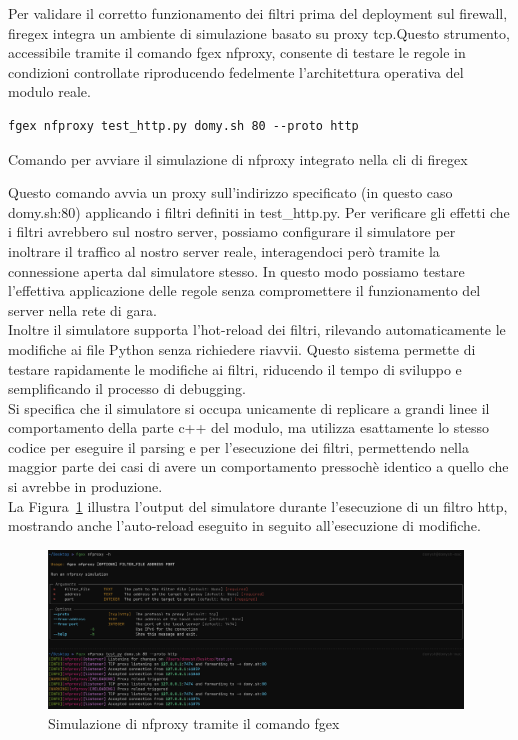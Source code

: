 Per validare il corretto funzionamento dei filtri prima del deployment sul firewall, firegex integra un ambiente di simulazione basato su proxy \gls{tcp}.\@ Questo strumento, accessibile tramite il comando fgex \gls{nfproxy}, consente di testare le regole in condizioni controllate riproducendo fedelmente l'architettura operativa del modulo reale.
\begin{listing}[H]
\begin{verbatim}
fgex nfproxy test_http.py domy.sh 80 --proto http
\end{verbatim}
\caption{Comando per avviare il simulazione di nfproxy integrato nella \gls{cli} di firegex}\label{lst:nfproxy_sim_cmd}
\end{listing}

Questo comando avvia un proxy sull'indirizzo specificato (in questo caso domy.sh:80) applicando i filtri definiti in test\_http.py.
Per verificare gli effetti che i filtri avrebbero sul nostro server, possiamo configurare il simulatore per inoltrare il traffico al nostro server reale, interagendoci però tramite la connessione aperta dal simulatore stesso. In questo modo possiamo testare l'effettiva applicazione delle regole senza compromettere il funzionamento del server nella rete di gara.  \\
Inoltre il simulatore supporta l'hot-reload dei filtri, rilevando automaticamente le modifiche ai file Python senza richiedere riavvii. Questo sistema permette di testare rapidamente le modifiche ai filtri, riducendo il tempo di sviluppo e semplificando il processo di debugging.\\
Si specifica che il simulatore si occupa unicamente di replicare a grandi linee il comportamento della parte c++ del modulo, ma utilizza esattamente lo stesso codice per eseguire il parsing e per l'esecuzione dei filtri, permettendo nella maggior parte dei casi di avere un comportamento pressochè identico a quello che si avrebbe in produzione.\\
La Figura~\ref{fig:nfproxy_sim} illustra l'output del simulatore durante l'esecuzione di un filtro \gls{http}, mostrando anche l'auto-reload eseguito in seguito all'esecuzione di modifiche.

\begin{figure}[H]
    \centering
    \includegraphics[width=0.98\textwidth]{images/chapter3/nfproxy_sim.png}
    \caption{Simulazione di \gls{nfproxy} tramite il comando fgex}\label{fig:nfproxy_sim}
\end{figure}

